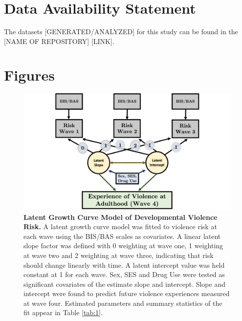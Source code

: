 \documentclass[utf8]{article}
\begin{document}
\section*{Data Availability Statement}
The datasets [GENERATED/ANALYZED] for this study can be found in the [NAME OF REPOSITORY] [LINK].
\clearpage
\section*{Figures}
\begin{figure}[h!]
\includegraphics[width=\textwidth,height=\textheight,keepaspectratio]{Fig-1}
\caption{\textbf{Latent Growth Curve Model of Developmental Violence Risk.} A latent growth curve model was fitted to violence risk at each wave using the BIS/BAS scales as covariates. A linear latent slope factor was defined with 0 weighting at wave one, 1 weighting at wave two and 2 weighting at wave three, indicating that risk should change linearly with time. A latent intercept value was held constant at 1 for each wave. Sex, SES and Drug Use were tested as significant covariates of the estimate slope and intercept. Slope and intercept were found to predict future violence experiences measured at wave four. Estimated parameters and summary statistics of the fit appear in Table \ref{tab:1}. \label{fig:1}}
\end{figure}
%
\end{document}
